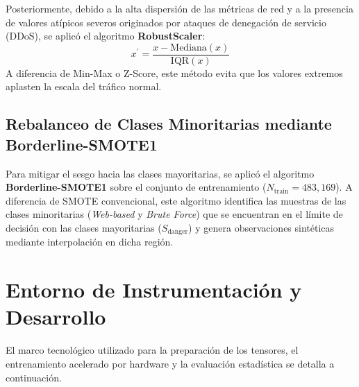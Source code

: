 Posteriormente, debido a la alta dispersión de las métricas de red y a la presencia de valores atípicos severos originados por ataques de denegación de servicio (DDoS), se aplicó el algoritmo \textbf{RobustScaler}:
\begin{equation}
x^{\prime} = \frac{x - \mathrm{Mediana}(x)}{\mathrm{IQR}(x)}
\end{equation}
A diferencia de Min-Max o Z-Score, este método evita que los valores extremos aplasten la escala del tráfico normal.

\subsection{Rebalanceo de Clases Minoritarias mediante Borderline-SMOTE1}
Para mitigar el sesgo hacia las clases mayoritarias, se aplicó el algoritmo \textbf{Borderline-SMOTE1} sobre el conjunto de entrenamiento ($N_{\mathrm{train}} = 483,169$). A diferencia de SMOTE convencional, este algoritmo identifica las muestras de las clases minoritarias (\textit{Web-based} y \textit{Brute Force}) que se encuentran en el límite de decisión con las clases mayoritarias ($S_{\mathrm{danger}}$) y genera observaciones sintéticas mediante interpolación en dicha región.

\section{Entorno de Instrumentación y Desarrollo}

El marco tecnológico utilizado para la preparación de los tensores, el entrenamiento acelerado por hardware y la evaluación estadística se detalla a continuación.


